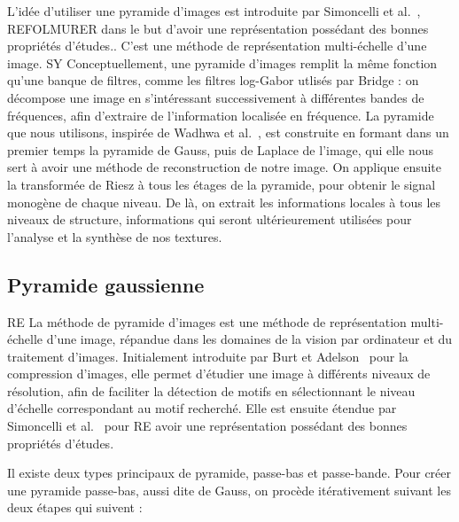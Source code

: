 L'idée d'utiliser une pyramide d'images est introduite par Simoncelli et al.~\cite{simoncelli_shiftable_1992}, {\color{red}REFOLMURER dans le but d'avoir une représentation possédant des bonnes propriétés d'études.}. C'est une méthode de représentation multi-échelle d'une image.
SY Conceptuellement, une pyramide d'images remplit la même fonction qu'une banque de filtres, comme les filtres log-Gabor utlisés par Bridge : on décompose une image en s'intéressant successivement à différentes bandes de fréquences, afin d'extraire de l'information localisée en fréquence. La pyramide que nous utilisons, inspirée de Wadhwa et al.~\cite{wadhwa_phase_based_2013}, est construite en formant dans un premier temps la pyramide de Gauss, puis de Laplace de l'image, qui elle nous sert à avoir une méthode de reconstruction de notre image. On applique ensuite la transformée de Riesz à tous les étages de la pyramide, pour obtenir le signal monogène de chaque niveau. De là, on extrait les informations locales à tous les niveaux de structure, informations qui seront ultérieurement utilisées pour l'analyse et la synthèse de nos textures.

\subsection{Pyramide gaussienne}

RE La méthode de pyramide d'images est une méthode de représentation multi-échelle d'une image, répandue dans les domaines de la vision par ordinateur et du traitement d'images. Initialement introduite par Burt et Adelson~\cite{burt_laplacian_1983} pour la compression d'images, elle permet d'étudier une image à différents niveaux de résolution, afin de faciliter la détection de motifs en sélectionnant le niveau d'échelle correspondant au motif recherché. Elle est ensuite étendue par Simoncelli et al.~\cite{simoncelli_shiftable_1992} pour RE avoir une représentation possédant des bonnes propriétés d'études.

\bigskip

Il existe deux types principaux de pyramide, passe-bas et passe-bande. Pour créer une pyramide passe-bas, aussi dite de Gauss, on procède itérativement suivant les deux étapes qui suivent :

